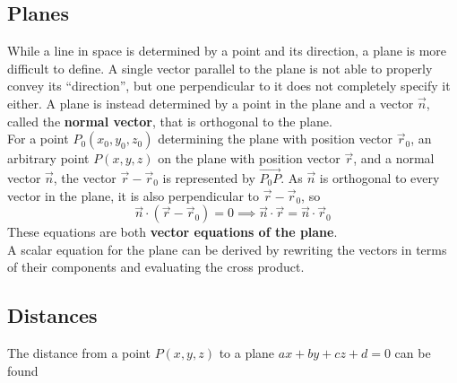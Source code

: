 \documentclass[../Calculus_\Roman{3}]{subfiles}
\begin{document}
					\subsection*{Planes}
						While a line in space is determined by a point and its direction, a plane is more difficult to define. A single vector parallel to the plane is not able to properly convey its \enquote{direction}, but one perpendicular to it does not completely specify it either. A plane is instead determined by a point in the plane and a vector $\vec{n}$, called the \textbf{normal vector}, that is orthogonal to the plane. \\
						For a point $P_0(x_0, y_0, z_0)$ determining the plane with position vector $\vec{r}_0$, an arbitrary point $P(x, y, z)$ on the plane with position vector $\vec{r}$, and a normal vector $\vec{n}$, the vector $\vec{r} - \vec{r}_0$ is represented by $\Vec{P_0P}$. As $\vec{n}$ is orthogonal to every vector in the plane, it is also perpendicular to $\vec{r} - \vec{r}_0$, so
							\[\vec{n} \cdot (\vec{r} - \vec{r}_0) = 0 \implies \vec{n}\cdot \vec{r} = \vec{n} \cdot \vec{r}_0\]
						These equations are both \textbf{vector equations of the plane}. \\
						A scalar equation for the plane can be derived by rewriting the vectors in terms of their components and evaluating the cross product.
					\subsection*{Distances}
						The distance from a point $P(x, y, z)$ to a plane $ax + by + cz + d = 0$ can be found 
\end{document}
